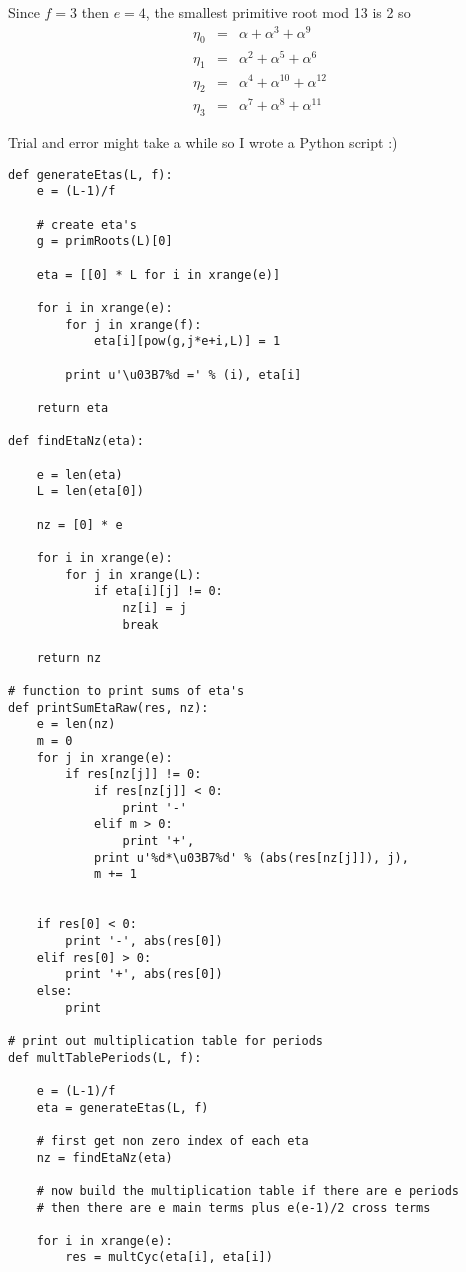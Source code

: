 \documentclass[aps,preprint,preprintnumbers,nofootinbib,showpacs,prd]{revtex4-1}
\newcommand{\nbea}{\begin{eqnarray*}}
\newcommand{\neea}{\end{eqnarray*}}
\begin{document}
Since $f = 3$ then $e = 4$, the smallest primitive root mod 13 is 2 so
%
\nbea
\eta_0 & = & \alpha + \alpha^3 + \alpha^9 \\
\eta_1 & = & \alpha^2 + \alpha^5 + \alpha^6 \\
\eta_2 & = & \alpha^4 + \alpha^{10} + \alpha^{12} \\
\eta_3 & = & \alpha^7 + \alpha^8 + \alpha^{11} 
\neea
%

Trial and error might take a while so I wrote a Python script :) 
%
\begin{Verbatim}[baselinestretch=0.75]
def generateEtas(L, f):
    e = (L-1)/f

    # create eta's
    g = primRoots(L)[0]

    eta = [[0] * L for i in xrange(e)]

    for i in xrange(e):
        for j in xrange(f):
            eta[i][pow(g,j*e+i,L)] = 1

        print u'\u03B7%d =' % (i), eta[i]

    return eta

def findEtaNz(eta):

    e = len(eta)
    L = len(eta[0])

    nz = [0] * e
    
    for i in xrange(e):
        for j in xrange(L):
            if eta[i][j] != 0:
                nz[i] = j
                break

    return nz

# function to print sums of eta's
def printSumEtaRaw(res, nz):
    e = len(nz)
    m = 0
    for j in xrange(e):
        if res[nz[j]] != 0:
            if res[nz[j]] < 0:
                print '-'
            elif m > 0:
                print '+',
            print u'%d*\u03B7%d' % (abs(res[nz[j]]), j),
            m += 1


    if res[0] < 0:
        print '-', abs(res[0])
    elif res[0] > 0:
        print '+', abs(res[0])
    else:
        print

# print out multiplication table for periods
def multTablePeriods(L, f):

    e = (L-1)/f
    eta = generateEtas(L, f)

    # first get non zero index of each eta
    nz = findEtaNz(eta)

    # now build the multiplication table if there are e periods
    # then there are e main terms plus e(e-1)/2 cross terms

    for i in xrange(e):
        res = multCyc(eta[i], eta[i])


\end{Verbatim}
\end{document}
